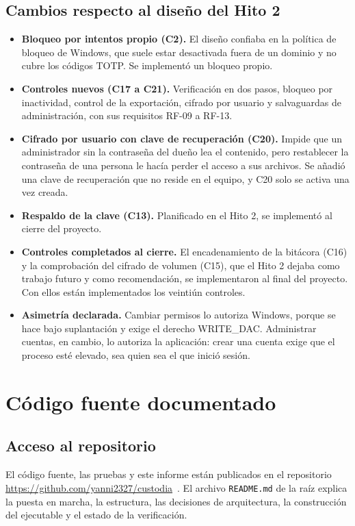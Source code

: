 \documentclass[conference]{IEEEtran}
\begin{document}
\subsection{Cambios respecto al diseño del Hito 2}
\begin{itemize}
    \item \textbf{Bloqueo por intentos propio (C2).} El diseño confiaba en la política de bloqueo de Windows, que suele estar desactivada fuera de un dominio y no cubre los códigos TOTP. Se implementó un bloqueo propio.
    \item \textbf{Controles nuevos (C17 a C21).} Verificación en dos pasos, bloqueo por inactividad, control de la exportación, cifrado por usuario y salvaguardas de administración, con sus requisitos RF-09 a RF-13.
    \item \textbf{Cifrado por usuario con clave de recuperación (C20).} Impide que un administrador sin la contraseña del dueño lea el contenido, pero restablecer la contraseña de una persona le hacía perder el acceso a sus archivos. Se añadió una clave de recuperación que no reside en el equipo, y C20 solo se activa una vez creada.
    \item \textbf{Respaldo de la clave (C13).} Planificado en el Hito 2, se implementó al cierre del proyecto.
    \item \textbf{Controles completados al cierre.} El encadenamiento de la bitácora (C16) y la comprobación del cifrado de volumen (C15), que el Hito 2 dejaba como trabajo futuro y como recomendación, se implementaron al final del proyecto. Con ellos están implementados los veintiún controles.
    \item \textbf{Asimetría declarada.} Cambiar permisos lo autoriza Windows, porque se hace bajo suplantación y exige el derecho WRITE\_DAC. Administrar cuentas, en cambio, lo autoriza la aplicación: crear una cuenta exige que el proceso esté elevado, sea quien sea el que inició sesión.
\end{itemize}

\section{Código fuente documentado}
\label{sec:codigo}

\subsection{Acceso al repositorio}
El código fuente, las pruebas y este informe están publicados en el repositorio \url{https://github.com/yanni2327/custodia}~\cite{repo}. El archivo \texttt{README.md} de la raíz explica la puesta en marcha, la estructura, las decisiones de arquitectura, la construcción del ejecutable y el estado de la verificación.
\end{document}
